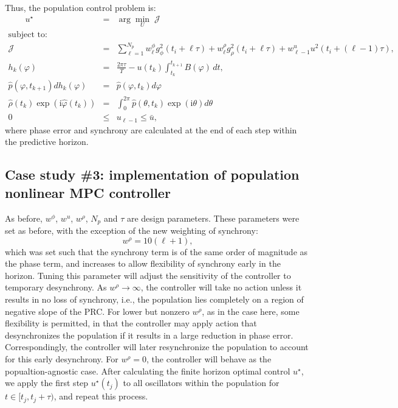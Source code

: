 Thus, the population control problem is:
\begin{eqnarray}
        \nonumber \qquad u^\star &=& \arg\min_{U} \;\mathcal J\\
        \nonumber \text{subject to:}&&\\       
        \nonumber \mathcal J &=& \sum_{\ell=1}^{N_p} w^\phi_{\ell}g^2_{\phi}(t_i+\ell\tau)+ w^\rho_{\ell}g^2_\rho(t_i+\ell\tau) + w^u_{\ell-1}u^2(t_i+(\ell-1)\tau),\\
        \nonumber  h_k(\varphi) &=& \frac{2\pi\tau}{T} -u(t_k) \int_{t_{k}}^{t_{k+1}}B(\varphi)\, dt,\\
        \label{eq:mpcPDFoptim} \hat p(\varphi, t_{k+1})dh_k(\varphi) &=& \hat p(\varphi, t_k)d\varphi\\
        \nonumber \hat\rho(t_k)\exp(\mathrm{i}\hat\varphi(t_k)) &=& \int_0^{2\pi} \hat p(\theta,t_k)\exp(\mathrm{i}\theta)d\theta\\
     \nonumber  0 &\le& u_{\ell-1}\le \bar u, 
\end{eqnarray}
where phase error and synchrony are calculated at the end of each step within the predictive horizon.





\subsection*{Case study \#3: implementation of population nonlinear MPC controller\label{ssec:popapply}}
As before, $w^{\phi}$, $w^u$, $w^\rho$, $N_p$ and $\tau$ are design parameters.
These parameters were set as before, with the exception of the new weighting of synchrony:
\begin{equation}
    \nonumber w^\rho = 10(\ell+1),
\end{equation}
which was set such that the synchrony term is of the same order of magnitude as the phase term, and increases to allow flexibility of synchrony early in the horizon.
Tuning this parameter will adjust the sensitivity of the controller to temporary desynchrony.
As $w^\rho \to \infty$, the controller will take no action unless it results in no loss of synchrony, i.e., the population lies completely on a region of negative slope of the PRC.
For lower but nonzero $w^\rho$, as in the case here, some flexibility is permitted, in that the controller may apply action that desynchronizes the population if it results in a large reduction in phase error.
Correspondingly, the controller will later resynchronize the population to account for this early desynchrony.
For $w^\rho=0$, the controller will behave as the popualtion-agnostic case.
After calculating the finite horizon optimal control $u^\star$, we apply the first step $u^\star(t_j)$ to all oscillators within the population for $t\in [t_j,t_j+\tau)$, and repeat this process.

